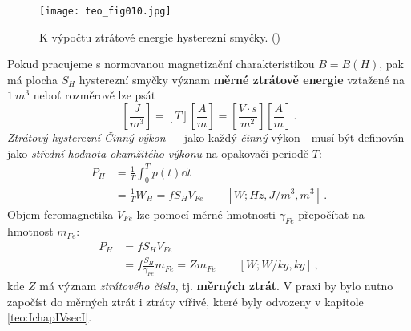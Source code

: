 {      \begin{figure}[ht!] %
        \centering
        \texttt{[image: teo\_fig010.jpg]}
        \caption{K výpočtu ztrátové energie hysterezní smyčky.
                 (\cite[s.~159]{Patocka4})}
        \label{teo:fig010}
      \end{figure}
      
      Pokud pracujeme s normovanou magnetizační charakteristikou \(B = B(H)\), pak má plocha 
      \(S_H\) hysterezní smyčky význam \textbf{měrné ztrátově energie} vztažené na \(\SI{1}{m^3}\) 
      neboť rozměrově lze psát
      \begin{equation*}
        \left[\frac{J}{m^3}\right] = [T]\left[\frac{A}{m}\right] 
                                   = \left[\frac{V\cdot s}{m^2}\right]\left[\frac{A}{m}\right] \,.
      \end{equation*}
      \emph{Ztrátový hysterezní Činný výkon} — jako každý \emph{činný} výkon - musí být definován 
      jako \emph{střední hodnota okamžitého výkonu} na opakovači periodě \(T\): 
      \begin{align}\label{TEO:eq041}
        P_H &= \frac{1}{T}\int_0^Tp(t)\dd{t}          \nonumber \\
            &= \frac{1}{T}W_H = fS_HV_{Fe}
               \qquad[W;Hz, J/m^3, m^3]\,.
      \end{align}
      Objem feromagnetika \(V_{Fe}\) lze pomocí měrné hmotnosti \(\gamma_{Fe}\) přepočítat na 
      hmotnost \(m_{Fe}\): 
      \begin{align}\label{TEO:eq042}
        P_H &= fS_HV_{Fe}                            \nonumber \\
            &= f\frac{S_H}{\gamma_{Fe}}m_{Fe} = Zm_{Fe} 
               \qquad[W; W/kg, kg]\,,
      \end{align}
      kde \(Z\) má význam \emph{ztrátového čísla}, tj. \textbf{měrných ztrát}. V praxi by bylo 
      nutno započíst do měrných ztrát i ztráty vířivé, které byly odvozeny v kapitole 
      \ref{teo:IchapIVsecI}.
      
}
